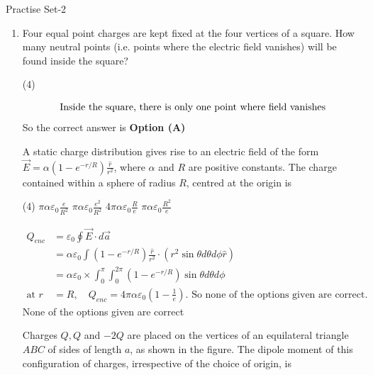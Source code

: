 \newpage
\begin{abox}
	Practise Set-2
\end{abox}
\begin{enumerate}[label=\color{ocre}\textbf{\arabic*.}]
\item Four equal point charges are kept fixed at the four vertices of a square. How many neutral points (i.e. points where the electric field vanishes) will be found inside the square?
{}
\begin{tasks}(4)
\end{tasks}
\begin{answer}
	\begin{align*}
	\intertext{Inside the square, there is only one point where field vanishes}
	\end{align*}
	So the correct answer is \textbf{Option (A)}
\end{answer}
\question A static charge distribution gives rise to an electric field of the form $\vec{E}=\alpha\left(1-e^{-r / R}\right) \frac{\hat{r}}{r^{2}}$, where $\alpha$ and $R$ are positive constants. The charge contained within a sphere of radius $R$, centred at the origin is
{}
\begin{tasks}(4)
	\task[\textbf{A.}] $\pi \alpha \varepsilon_{0} \frac{e}{R^{2}}$
	\task[\textbf{B.}]  $\pi \alpha \varepsilon_{0} \frac{e^{2}}{R^{2}}$
	\task[\textbf{C.}] $4 \pi \alpha \varepsilon_{0} \frac{R}{e}$
	\task[\textbf{D.}] $\pi \alpha \varepsilon_{0} \frac{R^{2}}{e}$
\end{tasks}
\begin{answer}
	\begin{align*}
	Q_{e n c}&=\varepsilon_{0} \oint \vec{E} \cdot d \vec{a}\\&=\alpha \varepsilon_{0} \int\left(1-e^{-r / R}\right) \frac{\hat{r}}{r^{2}} \cdot\left(r^{2} \sin \theta d \theta d \phi \hat{r}\right)\\&=\alpha \varepsilon_{0} \times \int_{0}^{\pi} \int_{0}^{2 \pi}\left(1-e^{-r / R}\right) \sin \theta d \theta d \phi\\
	\text{at }r&=R, \quad Q_{e n c}=4 \pi \alpha \varepsilon_{0}\left(1-\frac{1}{e}\right).\text{ So none of the options given are correct.}
	\end{align*}
	None of the options given are correct
\end{answer}
	\question Charges $Q, Q$ and $-2 Q$ are placed on the vertices of an equilateral triangle $A B C$ of sides of length $a$, as shown in the figure. The dipole moment of this configuration of charges, irrespective of the choice of origin, is
{}


\end{enumerate}
